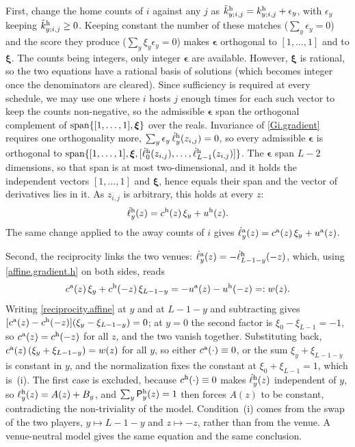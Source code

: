 \documentclass[letterpaper,12pt]{article}
\newcommand{\tnr}[1]{{\textnormal{#1}}}
\newcommand{\mf}[1]{\mathsf{#1}}
\newcommand{\bepsilon}{\boldsymbol{\epsilon}}
\newcommand{\bxi}{\boldsymbol{\xi}}
\newcommand{\set}[1]{\{#1\}}
\newcommand{\cd}{\cdot}
\newcommand{\ld}{\ldots}
\newcommand{\mfP}{\mf{P}}
\begin{document}
First, change the home counts of $i$ against any $j$ as $\tilde k^\tnr{h}_{y;i,j}=k^\tnr{h}_{y;i,j}+\epsilon_y$, with $\epsilon_y$ keeping $\tilde k^\tnr{h}_{y;i,j}\ge 0$. Keeping constant the number of these matches ($\sum_y \epsilon_y=0$) and the score they produce ($\sum_y\xi_y \epsilon_y=0$) makes $\bepsilon$ orthogonal to $[1,\ld,1]$ and to $\bxi$. The counts being integers, only integer $\bepsilon$ are available. However, $\bxi$ is rational, so the two equations have a rational basis of solutions (which becomes integer once the denominators are cleared). Since sufficiency is required at every schedule, we may use one where $i$ hosts $j$ enough times for each such vector to keep the counts non-negative, so the admissible $\bepsilon$ span the orthogonal complement of $\tnr{span}\set{[1,\ld,1],\bxi}$ over the reals. Invariance of \eqref{Gi.gradient} requires one orthogonality more, $\sum_y \epsilon_y\,\dot\ell^\tnr{h}_y(z_{i,j})=0$, so every admissible $\bepsilon$ is orthogonal to $\tnr{span}\set{[1,\ld,1],\bxi,[\dot\ell^\tnr{h}_0(z_{i,j}),\ld,\dot\ell^\tnr{h}_{L-1}(z_{i,j})]}$. The $\bepsilon$ span $L-2$ dimensions, so that span is at most two-dimensional, and it holds the independent vectors $[1,\ld,1]$ and $\bxi$, hence equals their span and the vector of derivatives lies in it. As $z_{i,j}$ is arbitrary, this holds at every $z$:
\begin{align}
\label{affine.gradient.h}
    \dot\ell^\tnr{h}_y(z)=c^\tnr{h}(z)\,\xi_y+u^\tnr{h}(z).
\end{align}
The same change applied to the away counts of $i$ gives $\dot\ell^\tnr{a}_y(z)=c^\tnr{a}(z)\,\xi_y+u^\tnr{a}(z)$.

Second, the reciprocity links the two venues: $\dot\ell^\tnr{a}_y(z)=-\dot\ell^\tnr{h}_{L-1-y}(-z)$, which, using \eqref{affine.gradient.h} on both sides, reads
\begin{align}
\label{reciprocity.affine}
    c^\tnr{a}(z)\,\xi_y+c^\tnr{h}(-z)\,\xi_{L-1-y}=-u^\tnr{a}(z)-u^\tnr{h}(-z)=:w(z).
\end{align}
Writing \eqref{reciprocity.affine} at $y$ and at $L-1-y$ and subtracting gives $[c^\tnr{a}(z)-c^\tnr{h}(-z)](\xi_y-\xi_{L-1-y})=0$; at $y=0$ the second factor is $\xi_0-\xi_{L-1}=-1$, so $c^\tnr{a}(z)=c^\tnr{h}(-z)$ for all $z$, and the two vanish together. Substituting back, $c^\tnr{a}(z)\,(\xi_y+\xi_{L-1-y})=w(z)$ for all $y$, so either $c^\tnr{a}(\cd)\equiv0$, or the sum $\xi_y+\xi_{L-1-y}$ is constant in $y$, and the normalization fixes the constant at $\xi_0+\xi_{L-1}=1$, which is~(i). The first case is excluded, because $c^\tnr{h}(\cd)\equiv0$ makes $\dot\ell^\tnr{h}_y(z)$ independent of $y$, so $\ell^\tnr{h}_y(z)=A(z)+B_y$, and $\sum_y\mfP^\tnr{h}_y(z)=1$ then forces $A(z)$ to be constant, contradicting the non-triviality of the model. Condition~(i) comes from the swap of the two players, $y\mapsto L-1-y$ and $z\mapsto-z$, rather than from the venue. A venue-neutral model gives the same equation and the same conclusion.
\end{document}
